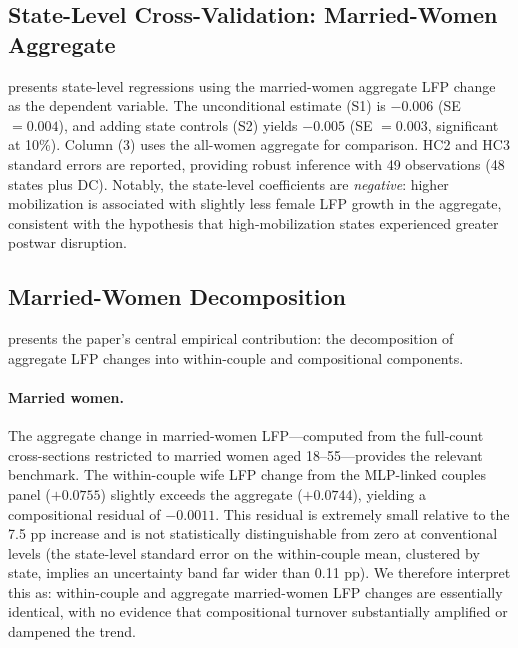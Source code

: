 \documentclass[12pt]{article}
\begin{document}
\subsection{State-Level Cross-Validation: Married-Women Aggregate}

 presents state-level regressions using the married-women aggregate LFP change as the dependent variable. The unconditional estimate (S1) is $-0.006$ (SE $= 0.004$), and adding state controls (S2) yields $-0.005$ (SE $= 0.003$, significant at 10\%). Column (3) uses the all-women aggregate for comparison. HC2 and HC3 standard errors are reported, providing robust inference with 49 observations (48 states plus DC). Notably, the state-level coefficients are \textit{negative}: higher mobilization is associated with slightly less female LFP growth in the aggregate, consistent with the hypothesis that high-mobilization states experienced greater postwar disruption.



\subsection{Married-Women Decomposition}

 presents the paper's central empirical contribution: the decomposition of aggregate LFP changes into within-couple and compositional components.



\paragraph{Married women.} The aggregate change in married-women LFP---computed from the full-count cross-sections restricted to married women aged 18--55---provides the relevant benchmark. The within-couple wife LFP change from the MLP-linked couples panel ($+0.0755$) slightly exceeds the aggregate ($+0.0744$), yielding a compositional residual of $-0.0011$. This residual is extremely small relative to the 7.5 pp increase and is not statistically distinguishable from zero at conventional levels (the state-level standard error on the within-couple mean, clustered by state, implies an uncertainty band far wider than 0.11 pp). We therefore interpret this as: within-couple and aggregate married-women LFP changes are essentially identical, with no evidence that compositional turnover substantially amplified or dampened the trend.
\end{document}
